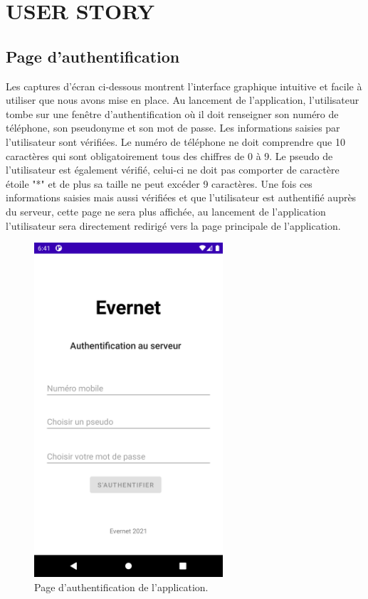 \chapter{ USER STORY}


\section{Page d'authentification}
Les captures d'écran ci-dessous montrent l'interface graphique intuitive et facile à utiliser que nous avons mise en place. Au lancement de l'application, l'utilisateur tombe sur une fenêtre d'authentification où il doit renseigner son numéro de téléphone, son pseudonyme et son mot de passe. Les informations saisies par l'utilisateur sont vérifiées. Le numéro de téléphone ne doit comprendre que 10 caractères qui sont obligatoirement tous des chiffres de 0 à 9. Le pseudo de l'utilisateur est également vérifié, celui-ci ne doit pas comporter de caractère étoile "*" et de plus sa taille ne peut excéder 9 caractères. Une fois ces informations saisies mais aussi vérifiées et que l'utilisateur est authentifié auprès du serveur, cette page ne sera plus affichée, au lancement de l'application l'utilisateur sera directement redirigé vers la page principale de l'application. 
    \begin{figure}[H]
    \begin{center}
    \includegraphics[width=7cm]{images/auth.png}
    \caption{Page d'authentification de l'application.}
    \end{center}
    \end{figure}
    
